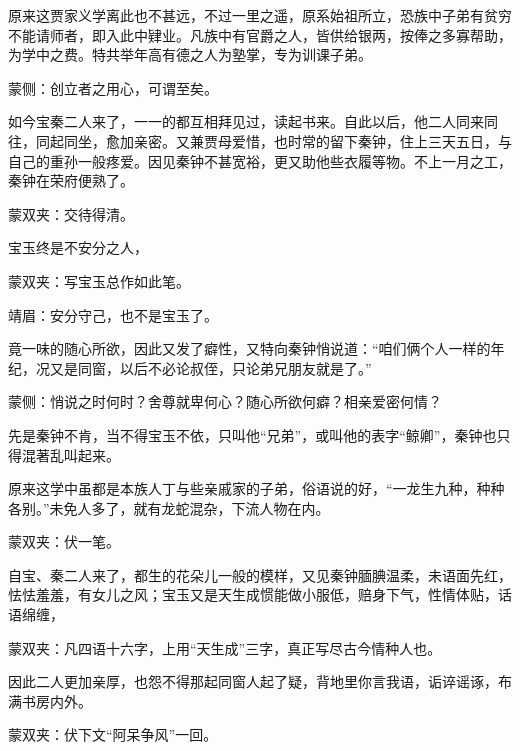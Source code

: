 \begin{parag}
    原来这贾家义学离此也不甚远，不过一里之遥，原系始祖所立，恐族中子弟有贫穷不能请师者，即入此中肄业。凡族中有官爵之人，皆供给银两，按俸之多寡帮助，为学中之费。特共举年高有德之人为塾掌，专为训课子弟。\begin{note}蒙侧：创立者之用心，可谓至矣。\end{note}如今宝秦二人来了，一一的都互相拜见过，读起书来。自此以后，他二人同来同往，同起同坐，愈加亲密。又兼贾母爱惜，也时常的留下秦钟，住上三天五日，与自己的重孙一般疼爱。因见秦钟不甚宽裕，更又助他些衣履等物。不上一月之工，秦钟在荣府便熟了。\begin{note}蒙双夹：交待得清。\end{note}宝玉终是不安分之人，\begin{note}蒙双夹：写宝玉总作如此笔。\end{note}\begin{note}靖眉：安分守己，也不是宝玉了。\end{note}竟一味的随心所欲，因此又发了癖性，又特向秦钟悄说道：“咱们俩个人一样的年纪，况又是同窗，以后不必论叔侄，只论弟兄朋友就是了。”\begin{note}蒙侧：悄说之时何时？舍尊就卑何心？随心所欲何癖？相亲爱密何情？\end{note}先是秦钟不肯，当不得宝玉不依，只叫他“兄弟”，或叫他的表字“鲸卿”，秦钟也只得混著乱叫起来。
\end{parag}


\begin{parag}
    原来这学中虽都是本族人丁与些亲戚家的子弟，俗语说的好，“一龙生九种，种种各别。”未免人多了，就有龙蛇混杂，下流人物在内。\begin{note}蒙双夹：伏一笔。\end{note}自宝、秦二人来了，都生的花朵儿一般的模样，又见秦钟腼腆温柔，未语面先红，怯怯羞羞，有女儿之风；宝玉又是天生成惯能做小服低，赔身下气，性情体贴，话语绵缠，\begin{note}蒙双夹：凡四语十六字，上用“天生成”三字，真正写尽古今情种人也。\end{note}因此二人更加亲厚，也怨不得那起同窗人起了疑，背地里你言我语，诟谇谣诼，布满书房内外。\begin{note}蒙双夹：伏下文“阿呆争风”一回。\end{note}
\end{parag}


